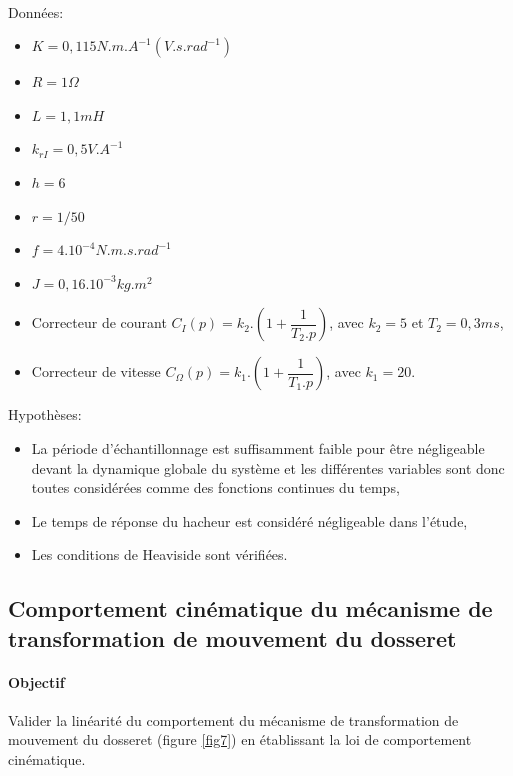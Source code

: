 ~\

Données: \\
\begin{itemize}
 \item $K = 0,115 N.m.A^{-1}(V.s.rad^{-1})$
 \item $R = 1 \Omega$
 \item $L = 1,1mH$
 \item $k_{rI}= 0,5 V. A^{-1}$
 \item $h = 6$
 \item $r = 1/50$
 \item $f = 4.10^{-4} N.m.s.rad^{-1}$
 \item $J=0,16.10^{-3} kg.m^2$
 \item Correcteur de courant $C_I(p)=k_2.\left(1+\dfrac{1}{T_2.p}\right)$, avec $k_2 = 5$ et $T_2=0,3ms$,
 \item Correcteur de vitesse $C_{\Omega}(p)=k_1.\left(1+\dfrac{1}{T_1.p}\right)$, avec $k_1=20$.
\end{itemize}

\newpage

Hypothèses: \\
\begin{itemize}
 \item La période d'échantillonnage est suffisamment faible pour être négligeable devant la dynamique globale du système et les différentes variables sont donc toutes considérées comme des fonctions continues du temps,
 \item Le temps de réponse du hacheur est considéré négligeable dans l'étude,
 \item Les conditions de Heaviside sont vérifiées.
\end{itemize}

\subsection{Comportement cinématique du mécanisme de transformation de mouvement du dosseret}

\paragraph{Objectif} Valider la linéarité du comportement du mécanisme de transformation de mouvement du dosseret (figure \ref{fig7}) en établissant la loi de comportement cinématique.

